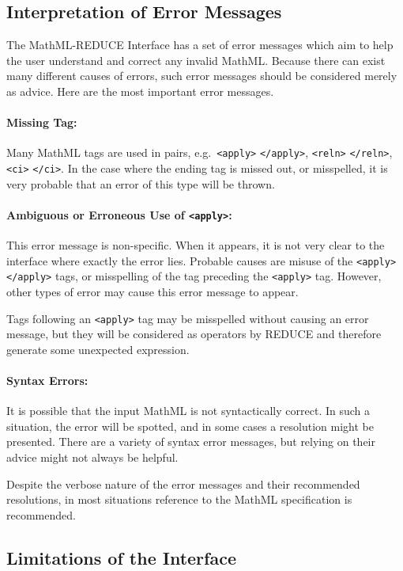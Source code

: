 \subsection{Interpretation of Error Messages}

The MathML-REDUCE Interface has a set of error messages which aim to
help the user understand and correct any invalid MathML\@.  Because
there can exist many different causes of errors, such error messages
should be considered merely as advice.  Here are the most important
error messages.

\paragraph{Missing Tag:}
Many MathML tags are used in pairs, e.g.\ \verb|<apply>|
\verb|</apply>|, \verb|<reln>| \verb|</reln>|, \verb|<ci>|
\verb|</ci>|.  In the case where the ending tag is missed out, or
misspelled, it is very probable that an error of this type will be
thrown.

\paragraph{Ambiguous or Erroneous Use of \texttt{\textless apply\textgreater}:}
This error message is non-specific.  When it appears, it is not very
clear to the interface where exactly the error lies.  Probable causes
are misuse of the \verb|<apply>| \verb|</apply>| tags, or misspelling
of the tag preceding the \verb|<apply>| tag.  However, other types of
error may cause this error message to appear.

Tags following an \verb|<apply>| tag may be misspelled without causing
an error message, but they will be considered as operators by REDUCE
and therefore generate some unexpected expression.

\paragraph{Syntax Errors:}
It is possible that the input MathML is not syntactically correct.  In
such a situation, the error will be spotted, and in some cases a
resolution might be presented.  There are a variety of syntax error
messages, but relying on their advice might not always be helpful.

Despite the verbose nature of the error messages and their recommended
resolutions, in most situations reference to the MathML specification
is recommended.

\subsection{Limitations of the Interface}
\label{mathml:limitations}

